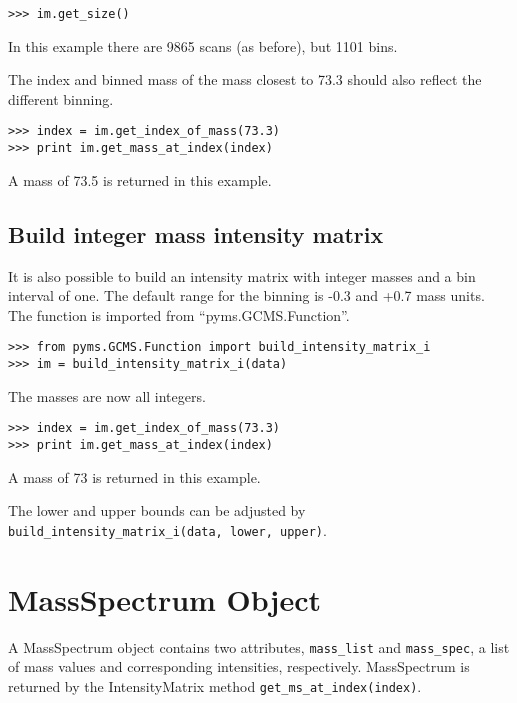 \begin{verbatim}
>>> im.get_size()
\end{verbatim}

In this example there are 9865 scans (as before), but 1101 bins.

The index and binned mass of the mass closest to 73.3 should also reflect the
different binning.

\begin{verbatim}
>>> index = im.get_index_of_mass(73.3)
>>> print im.get_mass_at_index(index)
\end{verbatim}

A mass of 73.5 is returned in this example.

\subsection{Build integer mass intensity matrix}


It is also possible to build an intensity matrix with integer masses and a bin
interval of one. The default range for the binning is -0.3 and +0.7 mass
units. The function is imported from ``pyms.GCMS.Function''.

\begin{verbatim}
>>> from pyms.GCMS.Function import build_intensity_matrix_i
>>> im = build_intensity_matrix_i(data)
\end{verbatim}

The masses are now all integers.

\begin{verbatim}
>>> index = im.get_index_of_mass(73.3)
>>> print im.get_mass_at_index(index)
\end{verbatim}

A mass of 73 is returned in this example.

The lower and upper bounds can be adjusted by {\tt
build\_intensity\_matrix\_i(data, lower, upper)}.

\section{MassSpectrum Object}


\noindent
A MassSpectrum object contains two attributes, {\tt mass\_list} and
{\tt mass\_spec}, a list of mass values and corresponding intensities,
respectively. MassSpectrum is returned by the IntensityMatrix method
{\tt get\_ms\_at\_index(index)}.


